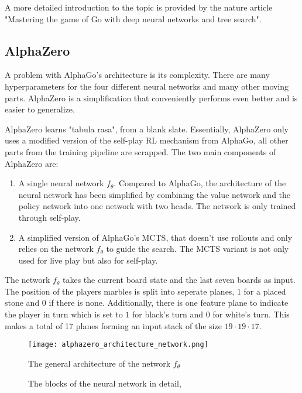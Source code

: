 A more detailed introduction to the topic is provided by the nature article "Mastering the game of Go with deep neural networks and tree search". \cite{silver_mastering_2016}

\subsection{AlphaZero}
A problem with AlphaGo's architecture is its complexity. There are many hyperparameters for the four different neural networks and many other moving parts. AlphaZero is a simplification that conveniently performs even better and is easier to generalize.

AlphaZero learns "tabula rasa", from a blank slate. Essentially, AlphaZero only uses a modified version of the self-play RL mechanism from AlphaGo, all other parts from the training pipeline are scrapped. The two main components of AlphaZero are:

\begin{enumerate}
    \item A single neural network $f_{\theta}$. Compared to AlphaGo, the architecture of the neural network has been simplified by combining the value network and the policy network into one network with two heads. The network is only trained through self-play.
    \item A simplified version of AlphaGo's MCTS, that doesn't use rollouts and only relies on the network $f_{\theta}$ to guide the search. The MCTS variant is not only used for live play but also for self-play.
\end{enumerate}

The network $f_{\theta}$ takes the current board state and the last seven boards as input. The position of the players marbles is split into seperate planes, $1$ for a placed stone and $0$ if there is none. Additionally, there is one feature plane to indicate the player in turn which is set to $1$ for black's turn and $0$ for white's turn. This makes a total of 17 planes forming an input stack of the size $19 \cdot 19 \cdot 17$.

\begin{figure}
    \centering
    \texttt{[image: alphazero\_architecture\_network.png]}
    \caption{The general architecture of the network $f_{\theta}$ \cite[cf. p. 27ff.]{silver_mastering_2017}}
    \label{alpha_zero_neural_network}
\end{figure}

\begin{figure}[!h]
    \centering
    \hfill
    \hfill
    \caption{The blocks of the neural network in detail, \cite[cf. p. 27ff.]{silver_mastering_2017}}
    \label{alpha_zero_blocks}
\end{figure}

